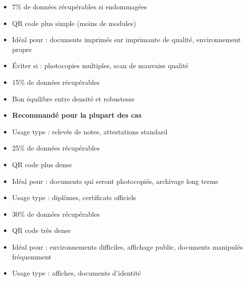 \begin{description}[leftmargin=2.5cm, style=nextline]
    \item[L (Low)]
    \begin{itemize}
        \item 7\% de données récupérables si endommagées
        \item QR code plus simple (moins de modules)
        \item Idéal pour : documents imprimés sur imprimante de qualité, environnement propre
        \item Éviter si : photocopies multiples, scan de mauvaise qualité
    \end{itemize}

    \item[M (Medium)]
    \begin{itemize}
        \item 15\% de données récupérables
        \item Bon équilibre entre densité et robustesse
        \item \textbf{Recommandé pour la plupart des cas}
        \item Usage type : relevés de notes, attestations standard
    \end{itemize}

    \item[Q (Quartile)]
    \begin{itemize}
        \item 25\% de données récupérables
        \item QR code plus dense
        \item Idéal pour : documents qui seront photocopiés, archivage long terme
        \item Usage type : diplômes, certificats officiels
    \end{itemize}

    \item[H (High)]
    \begin{itemize}
        \item 30\% de données récupérables
        \item QR code très dense
        \item Idéal pour : environnements difficiles, affichage public, documents manipulés fréquemment
        \item Usage type : affiches, documents d'identité
    \end{itemize}
\end{description}

